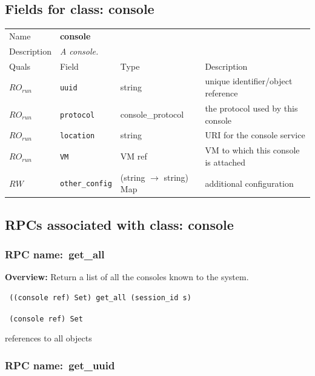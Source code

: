 \subsection{Fields for class: console}
\begin{longtable}{|lllp{}|}
\hline
\multicolumn{1}{|l}{Name} & \multicolumn{3}{l|}{\bf console} \\
\multicolumn{1}{|l}{Description} & \multicolumn{3}{l|}{\parbox{11cm}{\em A
console.}} \\
\hline
Quals & Field & Type & Description \\
\hline
$\mathit{RO}_\mathit{run}$ &  {\tt uuid} & string & unique identifier/object reference \\
$\mathit{RO}_\mathit{run}$ &  {\tt protocol} & console\_protocol & the protocol used by this console \\
$\mathit{RO}_\mathit{run}$ &  {\tt location} & string & URI for the console service \\
$\mathit{RO}_\mathit{run}$ &  {\tt VM} & VM ref & VM to which this console is attached \\
$\mathit{RW}$ &  {\tt other\_config} & (string $\rightarrow$ string) Map & additional configuration \\
\hline
\end{longtable}
\subsection{RPCs associated with class: console}
\subsubsection{RPC name:~get\_all}

{\bf Overview:} 
Return a list of all the consoles known to the system.

\begin{verbatim} ((console ref) Set) get_all (session_id s)\end{verbatim}


\vspace{0.3cm}

{\tt 
(console ref) Set
}


references to all objects
\vspace{0.3cm}
\vspace{0.3cm}
\vspace{0.3cm}
\subsubsection{RPC name:~get\_uuid}

